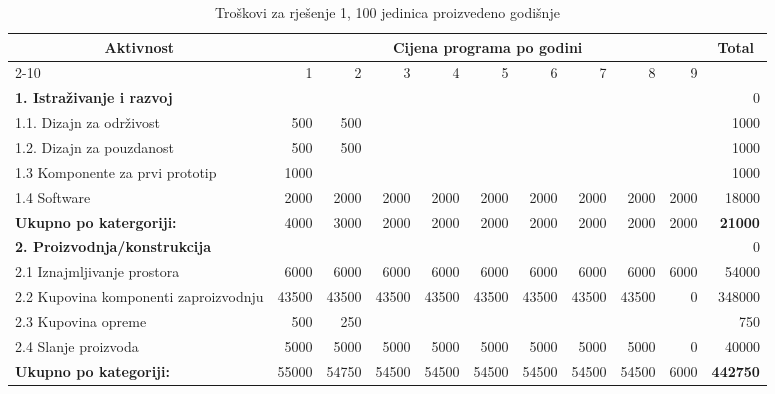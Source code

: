 \documentclass[12pt]{article}
\begin{document}
\begin{landscape}
\begin{table}[htbp]
  \centering
  \small
  \caption{Troškovi za rješenje 1, 100 jedinica proizvedeno godišnje}
    \begin{tabular}{lrrrrrrrrrr}
    \toprule
    \multicolumn{1}{c}{\multirow{2}[4]{*}{Aktivnost}} & \multicolumn{9}{c}{Cijena programa po godini}                         & \multicolumn{1}{c}{\multirow{2}[4]{*}{Total}} \\
\cmidrule{2-10}          & 1     & 2     & 3     & 4     & 5     & 6     & 7     & 8     & 9     &  \\
    \midrule
    \textbf{1. Istraživanje i razvoj} &       &       &       &       &       &       &       &       &       & 0 \\
    1.1. Dizajn za održivost & 500   & 500   &       &       &       &       &       &       &       & 1000 \\
    1.2. Dizajn za pouzdanost & 500   & 500   &       &       &       &       &       &       &       & 1000 \\
    1.3 Komponente za prvi prototip & 1000  &       &       &       &       &       &       &       &       & 1000 \\
    1.4 Software & 2000  & 2000  & 2000  & 2000  & 2000  & 2000  & 2000  & 2000  & 2000  & 18000 \\
    \midrule
    \textbf{Ukupno po katergoriji:} & 4000  & 3000  & 2000  & 2000  & 2000  & 2000  & 2000  & 2000  & 2000  & \textbf{21000} \\
    \midrule
    \textbf{2. Proizvodnja/konstrukcija} &       &       &       &       &       &       &       &       &       & 0 \\
    2.1 Iznajmljivanje prostora & 6000  & 6000  & 6000  & 6000  & 6000  & 6000  & 6000  & 6000  & 6000  & 54000 \\
    \multicolumn{1}{p{14.715em}}{2.2 Kupovina komponenti za\newline{}proizvodnju} & 43500 & 43500 & 43500 & 43500 & 43500 & 43500 & 43500 & 43500 & 0     & 348000 \\
    2.3 Kupovina opreme & 500   & 250   &       &       &       &       &       &       &       & 750 \\
    2.4 Slanje proizvoda & 5000  & 5000  & 5000  & 5000  & 5000  & 5000  & 5000  & 5000  & 0     & 40000 \\
    \midrule
    \textbf{Ukupno po kategoriji:} & 55000 & 54750 & 54500 & 54500 & 54500 & 54500 & 54500 & 54500 & 6000  & \textbf{442750} \\

\end{tabular}
\end{table}
\end{landscape}
\end{document}
